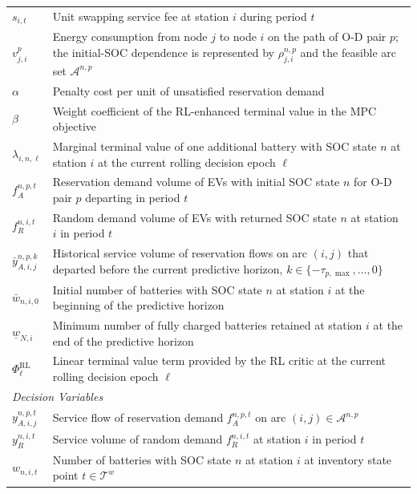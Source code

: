 \documentclass[12pt,hyperref,a4paper,UTF8]{ctexart}
\begin{document}
\begin{table}[!htbp]
\begin{tabular}{@{}lp{13cm}@{}}
    $s_{i,t}$ & Unit swapping service fee at station $i$ during period $t$ \\
    $v^{p}_{j,i}$ & Energy consumption from node $j$ to node $i$ on the path of O-D pair $p$; the initial-SOC dependence is represented by $\rho_{j,i}^{n,p}$ and the feasible arc set $\mathcal{A}^{n,p}$  \\
    $\alpha$ & Penalty cost per unit of unsatisfied reservation demand \\
    $\beta$ & Weight coefficient of the RL-enhanced terminal value in the MPC objective \\
    $\lambda_{i,n,\ell}$ & Marginal terminal value of one additional battery with SOC state $n$ at station $i$ at the current rolling decision epoch $\ell$ \\
    $f_{A}^{n,p,t}$ & Reservation demand volume of EVs with initial SOC state $n$ for O-D pair $p$ departing in period $t$ \\
    $f_{R}^{n,i,t}$ & Random demand volume of EVs with returned SOC state $n$ at station $i$ in period $t$ \\
    $\bar{y}_{A,i,j}^{n,p,k}$ & Historical service volume of reservation flows on arc $(i,j)$ that departed before the current predictive horizon, $k\in\{-\tau_{p,\max},\dots,0\}$ \\
    $\bar{w}_{n,i,0}$ & Initial number of batteries with SOC state $n$ at station $i$ at the beginning of the predictive horizon \\
    $\underline{w}_{N,i}$ & Minimum number of fully charged batteries retained at station $i$ at the end of the predictive horizon \\
    $\Phi^{\mathrm{RL}}_{\ell}$ & Linear terminal value term provided by the RL critic at the current rolling decision epoch $\ell$ \\
    \midrule
    \multicolumn{2}{l}{\textit{Decision Variables}} \\
    $y_{A,i,j}^{n,p,t}$ & Service flow of reservation demand $f_{A}^{n,p,t}$ on arc $(i,j)\in\mathcal{A}^{n,p}$ \\
    $y_{R}^{n,i,t}$ & Service volume of random demand $f_{R}^{n,i,t}$ at station $i$ in period $t$ \\
    $w_{n,i,t}$ & Number of batteries with SOC state $n$ at station $i$ at inventory state point $t\in\mathcal{T}^{w}$ \\
    \bottomrule
  \end{tabular}
\end{table}
\end{document}
